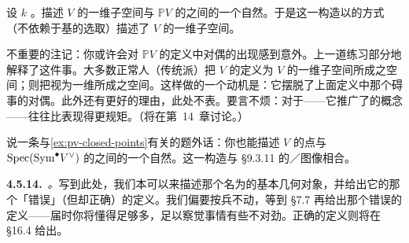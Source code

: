 \begin{exercise}[不重要练习]\label{ex:pv-closed-points}
设 $k$ \trAlgClosed。描述 $V$ 的一维子空间与 $\mathbb{P}V$ 的\trClosedPoint{}之间的一个自然\trBijection。于是这一构造以\trCanonical{}的方式（不依赖于基的选取）描述了\trVectorSpace{} $V$ 的一维子空间。
\end{exercise}

不重要的注记：你或许会对 $\mathbb{P}V$ 的定义中对偶的出现感到意外。上一道练习部分地解释了这件事。大多数正常人（传统派）把\trVectorSpace{} $V$ 的\emph{\trProjectivization}定义为 $V$ 的一维子空间所成之空间；\trGrothendieck{}则把\trProjectivization{}视为一维\emph{\trQuotient}所成之空间。这样做的一个动机是：它摆脱了上面定义中那个碍事的对偶。此外还有更好的理由，此处不表。要言不烦：对于\trCoherentSheaf——它推广了\trVectorBundle{}的概念——\trQuotient{}往往比\trSubobject{}表现得更规矩。（\trCoherentSheaf{}将在第~14~章讨论。）

说一条与\cref{ex:pv-closed-points}有关的题外话：你也能描述 $V$ 的点与 $\operatorname{Spec}(\mathrm{Sym}^{\bullet}V^{\vee})$ 的\trClosedPoint{}之间的一个自然\trBijection。这一构造与 \S9.3.11 的\trAffine\trCone／\trProjective\trCone{}图像相合。

\textbf{4.5.14.}\ \emph{\trGrassmannian{}。}\quad 写到此处，我们本可以来描述那个名为\trGrassmannian{}的基本几何对象，并给出它的那个「错误」（但却正确）的定义。我们偏要按兵不动，等到 \S7.7 再给出那个错误的定义——届时你将懂得足够多，足以察觉事情有些不对劲。正确的定义则将在 \S16.4 给出。
